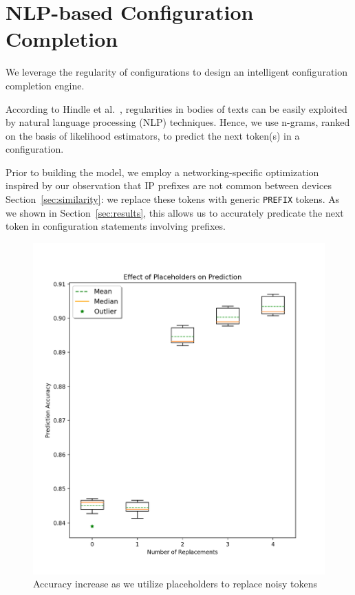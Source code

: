 \section{NLP-based Configuration Completion}

We leverage the regularity of configurations to design an intelligent
configuration completion engine.

According to Hindle et al.~\cite{naturalness}, regularities in bodies of texts
can be easily exploited by natural language processing (NLP) techniques.
Hence, we use n-grams, ranked on the basis of likelihood estimators, to predict
the next token(s) in a configuration.

Prior to building the model, we employ a networking-specific optimization
inspired by our observation that IP prefixes are not common between devices
Section~\ref{sec:similarity}: we replace these tokens with generic {\tt PREFIX}
tokens. As we shown in Section~\ref{sec:results}, this allows us to accurately
predicate the next token in configuration statements involving prefixes.


\begin{figure}
	\centering
	\includegraphics[width=\columnwidth]{replacement_analysis.png}
	\caption{Accuracy increase as we utilize placeholders to replace noisy tokens}
    \label{fig:replacement_analysis}
\end{figure}


